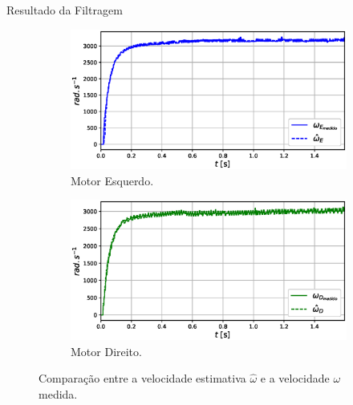 \begin{frame}{Resultado da Filtragem}

    \begin{figure}
        \begin{subfigure}{.48\textwidth}
            \centering
            \includegraphics[width=1.15\textwidth]{figuras/resultados/exp01/filtro_vs_sem_filtro_esquerdo100.eps}
            \caption{Motor Esquerdo.}
        \end{subfigure}
        \begin{subfigure}{.48\textwidth}
            \centering
            \includegraphics[width=1.15\textwidth]{figuras/resultados/exp01/filtro_vs_sem_filtro_direito100.eps}
            \caption{Motor Direito.}
        \end{subfigure}
        \caption{Comparação entre a velocidade estimativa $\hat{\omega}$ e a velocidade $\omega$ medida.}
    \end{figure}
    
\end{frame}

